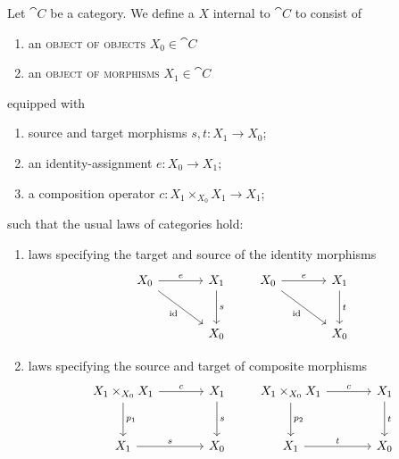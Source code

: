 \begin{node}\label{internal-0004}%
\begin{definition}\label{internal-0000}%
Let $\cat{C}$ be a category. We define a 
$X$ internal to $\cat{C}$ to consist of
\begin{enumerate}
\item an \textsc{object of objects} $X_{0}\in\cat{C}$
\item an \textsc{object of morphisms} $X_{1}\in\cat{C}$
\end{enumerate}
equipped with
\begin{enumerate}
\item source and target morphisms $s,t\colon X_{1}\to X_{0}$;
\item an identity-assignment $e\colon X_{0}\to X_{1}$;
\item a composition operator $c\colon X_{1}\times_{X_{0}}X_{1}\to X_{1}$;
\end{enumerate}
such that the usual laws of categories hold:
\begin{enumerate}
\item laws specifying the target and source of the identity morphisms
\begin{equation*}
\begin{tikzcd}[sep=large]
X_{0}\arrow[dr,swap,"\id"]\arrow[r,"e"] & X_{1}\arrow[d,"s"]\\
                                       & X_{0}
\end{tikzcd}\qquad
\begin{tikzcd}[sep=large]
X_{0}\arrow[dr,swap,"\id"]\arrow[r,"e"] & X_{1}\arrow[d,"t"]\\
                                       & X_{0}
\end{tikzcd}
\end{equation*}
\item laws specifying the source and target of composite morphisms
\begin{equation*}
\begin{tikzcd}[sep=large]
X_{1}\times_{X_{0}}X_{1}\ar[d,"p_{1}"] \ar[r,"c"] & X_{1}\ar[d,"s"]\\
    X_{1} \ar[r,"s"] & X_{0}
\end{tikzcd}\qquad
\begin{tikzcd}[sep=large]
X_{1}\times_{X_{0}}X_{1}\ar[d,"p_{2}"] \ar[r,"c"] & X_{1}\ar[d,"t"]\\
    X_{1} \ar[r,"t"] & X_{0}
\end{tikzcd}
\end{equation*}

\end{enumerate}
\end{definition}
\end{node}
